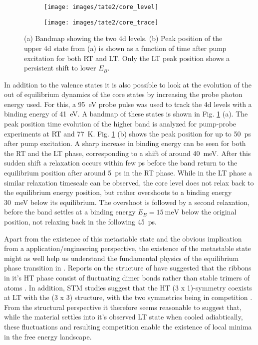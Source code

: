 \begin{figure}
	\centering
	\begin{subfigure}[b]{0.33\textwidth}
		\texttt{[image: images/tate2/core\_level]}
		\caption{}
	\end{subfigure}
	\begin{subfigure}[b]{0.66\textwidth}
		\texttt{[image: images/tate2/core\_trace]}
		\caption{}
	\end{subfigure}
	\caption{(a) Bandmap showing the two  4d levels. (b) Peak position of the upper 4d state from (a) is shown as a function of time after pump excitation for both RT and LT. Only the LT peak position shows a persistent shift to lower $E_B$.}
	\label{fig:tate_core}
\end{figure}


In addition to the valence states it is also possible to look at the evolution of the out of equilibrium dynamics of the core states by increasing the probe photon energy used.
For this, a \qty{95}{\electronvolt} probe pulse was used to track the  4d levels with a binding energy of \qty{41}{\electronvolt}.
A bandmap of these states is shown in Fig. \ref{fig:tate_core} (a).
The peak position time evolution of the higher band is analyzed for pump-probe experiments at RT and \qty{77}{\kelvin}.
Fig. \ref{fig:tate_core} (b) shows the peak position for up to \qty{50}{\pico\second} after pump excitation.
A sharp increase in binding energy can be seen for both the RT and the LT phase, corresponding to a shift of around \qty{40}{\milli\electronvolt}.
After this sudden shift a relaxation occurs within few \unit{\pico\second} before the band return to the equilibrium position after around \qty{5}{\pico\second} in the RT phase.
While in the LT phase a similar relaxation timescale can be observed, the core level does not relax back to the equilibrium energy position, but rather overshoots to a binding energy \qty{30}{\milli\electronvolt} below its equilibrium.
The overshoot is followed by a second relaxation, before the band settles at a binding energy $E_B=\qty{15}{\milli\electronvolt}$ below the original position, not relaxing back in the following \qty{45}{\pico\second}.

Apart from the existence of this metastable state and the obvious implication from a application/engineering perspective, the existence of the metastable state might as well help us understand the fundamental physics of the equilibrium phase transition in .
Reports on the structure of  have suggested that the ribbons in it's HT phase consist of fluctuating dimer bonds rather than stable trimers of  atoms \cite{katayama_observation_2023}.
In addition, STM studies suggest that the HT (3 x 1)-symmetry coexists at LT with the (3 x 3) structure, with the two symmetries being in competition \cite{feng_charge_2016}.
From the structural perspective it therefore seems reasonable to suggest that, while the material settles into it's observed LT state when cooled adiabtically, these fluctuations and resulting competition enable the existence of local minima in the free energy landscape.

